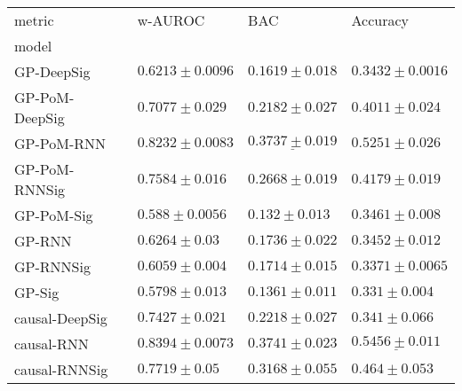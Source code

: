 \begin{tabular}{llll}
\toprule
metric &                                         w-AUROC &                                             BAC &                                       Accuracy \\
model          &                                                 &                                                 &                                                \\
\midrule
GP-DeepSig     &                           $ 0.6213 \pm 0.0096 $ &                            $ 0.1619 \pm 0.018 $ &                          $ 0.3432 \pm 0.0016 $ \\
GP-PoM-DeepSig &                            $ 0.7077 \pm 0.029 $ &                            $ 0.2182 \pm 0.027 $ &                           $ 0.4011 \pm 0.024 $ \\
GP-PoM-RNN     &                           $ 0.8232 \pm 0.0083 $ &             $  \underline{ 0.3737 \pm 0.019 } $ &                           $ 0.5251 \pm 0.026 $ \\
GP-PoM-RNNSig  &                            $ 0.7584 \pm 0.016 $ &                            $ 0.2668 \pm 0.019 $ &                           $ 0.4179 \pm 0.019 $ \\
GP-PoM-Sig     &                            $ 0.588 \pm 0.0056 $ &                             $ 0.132 \pm 0.013 $ &                           $ 0.3461 \pm 0.008 $ \\
GP-RNN         &                             $ 0.6264 \pm 0.03 $ &                            $ 0.1736 \pm 0.022 $ &                           $ 0.3452 \pm 0.012 $ \\
GP-RNNSig      &                            $ 0.6059 \pm 0.004 $ &                            $ 0.1714 \pm 0.015 $ &                          $ 0.3371 \pm 0.0065 $ \\
GP-Sig         &                            $ 0.5798 \pm 0.013 $ &                            $ 0.1361 \pm 0.011 $ &                            $ 0.331 \pm 0.004 $ \\
causal-DeepSig &                            $ 0.7427 \pm 0.021 $ &                            $ 0.2218 \pm 0.027 $ &                            $ 0.341 \pm 0.066 $ \\
causal-RNN     &               $  \mathbf{ 0.8394 \pm 0.0073 } $ &                $  \mathbf{ 0.3741 \pm 0.023 } $ &  $  \mathbf{ \underline{ 0.5456 \pm 0.011 }} $ \\
causal-RNNSig  &                             $ 0.7719 \pm 0.05 $ &                            $ 0.3168 \pm 0.055 $ &                            $ 0.464 \pm 0.053 $ \\

\end{tabular}
